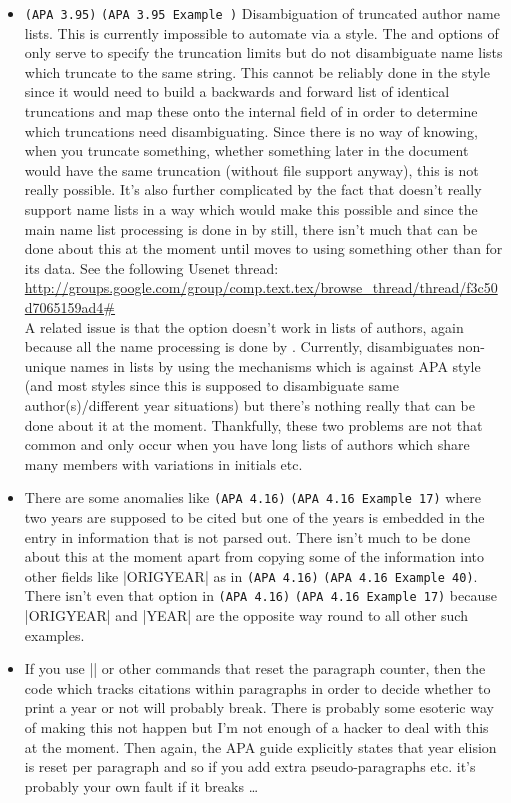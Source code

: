 \documentclass{ltxdockit}
\newcommand\apa[2][]{\ifthenelse{\equal{#1}{}}%
                       {\texttt{(APA #2)}}%
                       {\texttt{(APA #2 Example #1)}}}
\begin{document}
\begin{itemize}
\item \apa{3.95} Disambiguation of truncated author name lists. This is
  currently impossible to automate via a  style. The
   and  options of  only serve to
  specify the truncation limits but do not disambiguate name lists which
  truncate to the same string. This cannot be reliably done in the style
  since it would need to build a backwards and forward list of identical
  truncations and map these onto the internal  field of
   in order to determine which truncations need
  disambiguating. Since there is no way of knowing, when you truncate
  something, whether something later in the document would have the same
  truncation (without  file support anyway), this is not really
  possible. It's also further complicated by the fact that \bibtex doesn't
  really support name lists in a way which would make this possible and
  since the main name list processing is done in  by \bibtex
  still, there isn't much that can be done about this at the moment until
   moves to using something other than \bibtex for its data.
  See the following Usenet thread:\\

  \url{http://groups.google.com/group/comp.text.tex/browse_thread/thread/f3c50d7065159ad4#}\\

  A related issue is that the  option doesn't work in lists
  of authors, again because all the name processing is done by \bibtex.
  Currently,  disambiguates non-unique names in lists by
  using the  mechanisms which is against APA style (and most
  styles since this is supposed to disambiguate same author(s)/different
  year situations) but there's nothing really that can be done about it at
  the moment. Thankfully, these two problems are not that common and only
  occur when you have long lists of authors which share many members with
  variations in initials etc.
\item There are some anomalies like \apa[17]{4.16} where two years are
  supposed to be cited but one of the years is embedded in the 
  entry in information that is not parsed out. There isn't much to be done
  about this at the moment apart from copying some of the information into
  other fields like |ORIGYEAR| as in \apa[40]{4.16}. There isn't even that
  option in \apa[17]{4.16} because |ORIGYEAR| and |YEAR| are the opposite
  way round to all other such examples.
\item If you use |\marginpar| or other commands that reset the paragraph
  counter, then the code which tracks citations within paragraphs in order
  to decide whether to print a year or not will probably break. There is
  probably some esoteric way of making this not happen but I'm not enough
  of a \tex hacker to deal with this at the moment. Then again, the APA
  guide explicitly states that year elision is reset per paragraph and so
  if you add extra pseudo-paragraphs etc. it's probably your own fault if
  it breaks \ldots 
\end{itemize}
\end{document}
